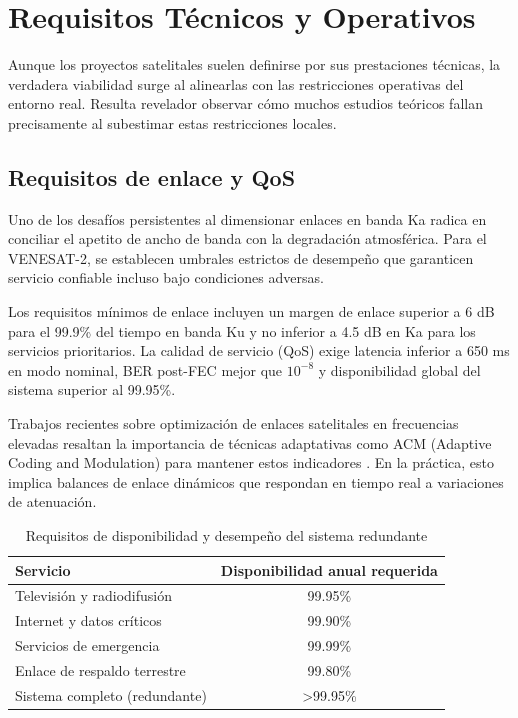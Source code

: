 \section{Requisitos Técnicos y Operativos}

Aunque los proyectos satelitales suelen definirse por sus prestaciones técnicas, la verdadera viabilidad surge al alinearlas con las restricciones operativas del entorno real. Resulta revelador observar cómo muchos estudios teóricos fallan precisamente al subestimar estas restricciones locales.

\subsection{Requisitos de enlace y QoS}

Uno de los desafíos persistentes al dimensionar enlaces en banda Ka radica en conciliar el apetito de ancho de banda con la degradación atmosférica. Para el VENESAT-2, se establecen umbrales estrictos de desempeño que garanticen servicio confiable incluso bajo condiciones adversas.

Los requisitos mínimos de enlace incluyen un margen de enlace superior a 6 dB para el 99.9\% del tiempo en banda Ku y no inferior a 4.5 dB en Ka para los servicios prioritarios. La calidad de servicio (QoS) exige latencia inferior a 650 ms en modo nominal, BER post-FEC mejor que \(10^{-8}\) y disponibilidad global del sistema superior al 99.95\%. 

Trabajos recientes sobre optimización de enlaces satelitales en frecuencias elevadas resaltan la importancia de técnicas adaptativas como ACM (Adaptive Coding and Modulation) para mantener estos indicadores \cite{LinkBudgetKa2025}. En la práctica, esto implica balances de enlace dinámicos que respondan en tiempo real a variaciones de atenuación.

\begin{table}[h]
\centering
\caption{Requisitos de disponibilidad y desempeño del sistema redundante}
\label{tab:disponibilidad}
\begin{tabular}{lc}
\hline
\textbf{Servicio} & \textbf{Disponibilidad anual requerida} \\
\hline
Televisión y radiodifusión & 99.95\% \\
Internet y datos críticos & 99.90\% \\
Servicios de emergencia & 99.99\% \\
Enlace de respaldo terrestre & 99.80\% \\
Sistema completo (redundante) & >99.95\% \\
\hline
\end{tabular}
\end{table}

